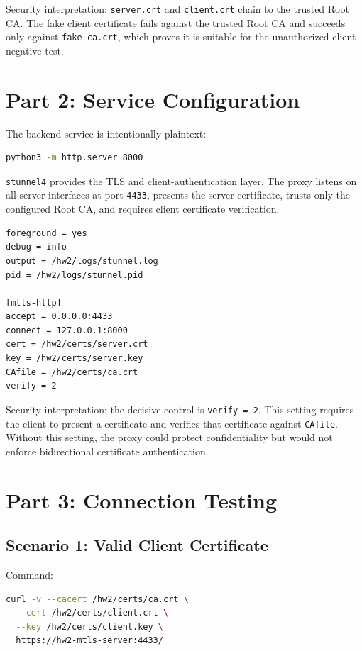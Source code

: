 \documentclass[11pt]{article}
\begin{document}
Security interpretation: \texttt{server.crt} and \texttt{client.crt} chain to the trusted Root CA. The fake client certificate fails against the trusted Root CA and succeeds only against \texttt{fake-ca.crt}, which proves it is suitable for the unauthorized-client negative test.

\section{Part 2: Service Configuration}

The backend service is intentionally plaintext:

\begin{lstlisting}[language=bash]
python3 -m http.server 8000
\end{lstlisting}

\texttt{stunnel4} provides the TLS and client-authentication layer. The proxy listens on all server interfaces at port \texttt{4433}, presents the server certificate, trusts only the configured Root CA, and requires client certificate verification.

\begin{lstlisting}
foreground = yes
debug = info
output = /hw2/logs/stunnel.log
pid = /hw2/logs/stunnel.pid

[mtls-http]
accept = 0.0.0.0:4433
connect = 127.0.0.1:8000
cert = /hw2/certs/server.crt
key = /hw2/certs/server.key
CAfile = /hw2/certs/ca.crt
verify = 2
\end{lstlisting}

Security interpretation: the decisive control is \texttt{verify = 2}. This setting requires the client to present a certificate and verifies that certificate against \texttt{CAfile}. Without this setting, the proxy could protect confidentiality but would not enforce bidirectional certificate authentication.

\section{Part 3: Connection Testing}

\subsection{Scenario 1: Valid Client Certificate}

Command:

\begin{lstlisting}[language=bash]
curl -v --cacert /hw2/certs/ca.crt \
  --cert /hw2/certs/client.crt \
  --key /hw2/certs/client.key \
  https://hw2-mtls-server:4433/
\end{lstlisting}
\end{document}
